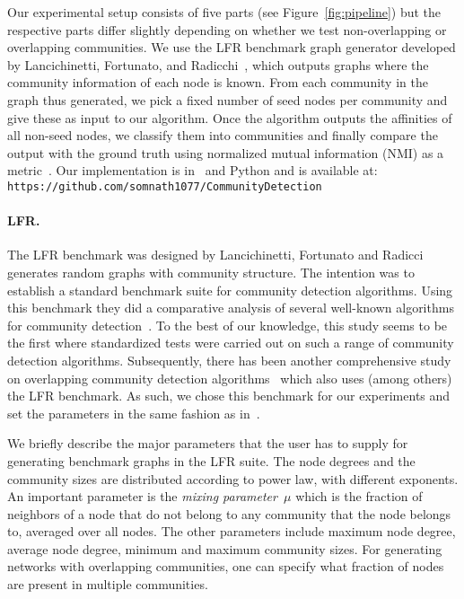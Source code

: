Our experimental setup consists of five parts (see Figure~\ref{fig:pipeline}) but the 
respective parts differ slightly depending on whether we test non-overlapping or overlapping 
communities. We use the LFR benchmark graph generator developed by Lancichinetti, 
Fortunato, and Radicchi~\cite{LFR08, LF09}, which outputs graphs where the community 
information of each node is known. From each community in the graph thus generated, 
we pick a fixed number of seed nodes per community and give these as input to our algorithm. 
Once the algorithm outputs the affinities of all non-seed nodes, we classify them into 
communities and finally compare the output with the ground truth using 
normalized mutual information (NMI) as a metric~\cite{DDDA05}.
Our implementation is in \CPP\ and Python and is available at: 
\texttt{https://github.com/somnath1077/CommunityDetection}


\paragraph{LFR.}
The LFR benchmark was designed by Lancichinetti, Fortunato and Radicci~\cite{LFR08}
generates random graphs with community structure. The intention was to establish a 
standard benchmark suite for community detection algorithms. Using this benchmark they 
did a comparative analysis of several well-known algorithms
for community detection~\cite{LF09}. To the best of our knowledge, this study seems to be the 
first where standardized tests were carried out on such a range of community detection algorithms. 
Subsequently, there has been another comprehensive study on overlapping community detection 
algorithms~\cite{XKS13} which also uses (among others) the LFR benchmark. As such, we chose this 
benchmark for our experiments and set the parameters in the same fashion as in~\cite{LF09}. 

We briefly describe the major parameters that the user has to supply 
for generating benchmark graphs in the LFR suite. The node degrees and the 
community sizes are distributed according to power law, with different exponents. 
An important parameter is the \emph{mixing parameter~$\mu$} which is the fraction of neighbors 
of a node that do not belong to any community that the node belongs to, averaged over all nodes.
The other parameters include maximum node degree, average node degree, 
minimum and maximum community sizes. For generating networks with overlapping communities, 
one can specify what fraction of nodes are present in multiple communities.


